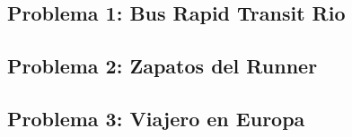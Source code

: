 \documentclass[12pt]{article}
\begin{document}
\thispagestyle{fancy}

\subsection*{Problema 1: Bus Rapid Transit Rio}


\subsection*{Problema 2: Zapatos del Runner}


\subsection*{Problema 3: Viajero en Europa}

\end{document}
